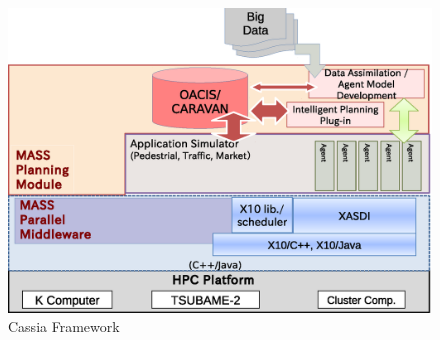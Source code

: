 \begin{figure}
  \centering
  \includegraphics[width=.8\linewidth]{Figs.noda/figure-01.framework.eps}
  \caption{Cassia Framework}
  \label{fig:Figs.noda/figure-01.framework.eps}
\end{figure}

